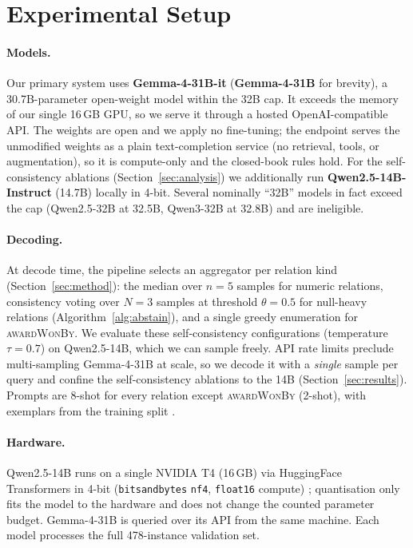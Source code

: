 \section{Experimental Setup}
\label{sec:setup}
\paragraph{Models.}
Our primary system uses \textbf{Gemma-4-31B-it} \citep{gemma4}
(\textbf{Gemma-4-31B} for brevity), a 30.7B-parameter open-weight model within the
32B cap. It exceeds the memory of our
single 16\,GB GPU, so we serve it through a hosted OpenAI-compatible API. The
weights are open and we apply no fine-tuning; the endpoint serves the unmodified
weights as a plain text-completion service (no retrieval, tools, or augmentation),
so it is compute-only and the closed-book rules hold. For the self-consistency ablations (Section~\ref{sec:analysis}) we
additionally run \textbf{Qwen2.5-14B-Instruct} \citep{qwen2024} (14.7B) locally in
4-bit. Several nominally ``32B'' models in fact exceed the cap (Qwen2.5-32B at
32.5B, Qwen3-32B at 32.8B) and are ineligible.

\paragraph{Decoding.}
At decode time, the pipeline selects an aggregator per relation kind
(Section~\ref{sec:method}): the median over $n{=}5$ samples for numeric relations,
consistency voting over $N{=}3$ samples at threshold $\theta{=}0.5$ for null-heavy
relations (Algorithm~\ref{alg:abstain}), and a single greedy enumeration for
\textsc{awardWonBy}. We evaluate these self-consistency configurations (temperature
$\tau{=}0.7$) on Qwen2.5-14B, which we can sample freely. API rate limits preclude
multi-sampling Gemma-4-31B at scale, so we decode it with a \emph{single} sample
per query and confine the self-consistency ablations to the 14B
(Section~\ref{sec:results}). Prompts are 8-shot for every relation except
\textsc{awardWonBy} (2-shot), with exemplars from the training split
\citep{brown2020gpt3}.

\paragraph{Hardware.}
Qwen2.5-14B runs on a single NVIDIA T4 (16\,GB) via HuggingFace Transformers in
4-bit (\texttt{bitsandbytes} \texttt{nf4}, \texttt{float16} compute)
\citep{dettmers2023qlora}; quantisation only fits the model to the hardware and
does not change the counted parameter budget. Gemma-4-31B is queried over its API
from the same machine. Each model processes the full 478-instance validation set.

